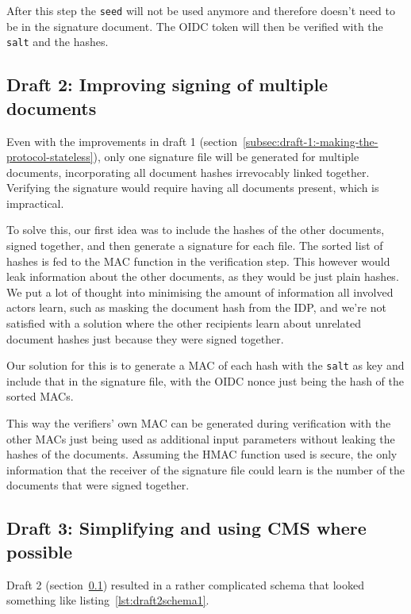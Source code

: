 After this step the \texttt{seed} will not be used anymore and therefore doesn't need to be in the signature document.
The \gls{OIDC} token will then be verified with the \texttt{salt} and the hashes.

\subsection{Draft 2: Improving signing of multiple documents}\label{subsec:draft-2:-improving-signing-of-multiple-documents}
Even with the improvements in draft 1 (section~\ref{subsec:draft-1:-making-the-protocol-stateless}),
only one signature file will be generated for multiple documents, incorporating all document hashes irrevocably linked together.
Verifying the signature would require having all documents present, which is impractical.

To solve this, our first idea was to include the hashes of the other documents, signed together,
and then generate a signature for each file.
The sorted list of hashes is fed to the \gls{MAC} function in the verification step.
This however would leak information about the other documents, as they would be just plain hashes.
We put a lot of thought into minimising the amount of information all involved actors learn,
such as masking the document hash from the \gls{IDP}, and we're not satisfied with a solution where the other recipients learn
about unrelated document hashes just because they were signed together.

Our solution for this is to generate a \gls{MAC} of each hash with the \texttt{salt} as key and include that in the signature file,
with the \gls{OIDC} nonce just being the hash of the sorted \gls{MAC}s.

This way the verifiers' own \gls{MAC} can be generated during verification with the other \gls{MAC}s just being used as additional input parameters without leaking the hashes of the documents.
Assuming the \gls{HMAC} function used is secure,
the only information that the receiver of the signature file could learn is the number of the documents that were signed together.

\subsection{Draft 3: Simplifying and using CMS where possible}\label{subsec:draft-3:-simplifying-and-using-cms-where-possible}
Draft 2 (section~\ref{subsec:draft-2:-improving-signing-of-multiple-documents})
resulted in a rather complicated schema that looked something like listing~\ref{lst:draft2schema1}.


